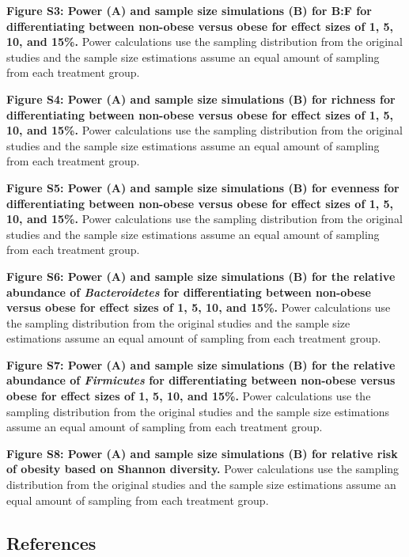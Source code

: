 \documentclass[12pt,]{article}
\begin{document}
\textbf{Figure S3: Power (A) and sample size simulations (B) for B:F for
differentiating between non-obese versus obese for effect sizes of 1, 5,
10, and 15\%.} Power calculations use the sampling distribution from the
original studies and the sample size estimations assume an equal amount
of sampling from each treatment group.

\textbf{Figure S4: Power (A) and sample size simulations (B) for
richness for differentiating between non-obese versus obese for effect
sizes of 1, 5, 10, and 15\%.} Power calculations use the sampling
distribution from the original studies and the sample size estimations
assume an equal amount of sampling from each treatment group.

\textbf{Figure S5: Power (A) and sample size simulations (B) for
evenness for differentiating between non-obese versus obese for effect
sizes of 1, 5, 10, and 15\%.} Power calculations use the sampling
distribution from the original studies and the sample size estimations
assume an equal amount of sampling from each treatment group.

\textbf{Figure S6: Power (A) and sample size simulations (B) for the
relative abundance of \emph{Bacteroidetes} for differentiating between
non-obese versus obese for effect sizes of 1, 5, 10, and 15\%.} Power
calculations use the sampling distribution from the original studies and
the sample size estimations assume an equal amount of sampling from each
treatment group.

\textbf{Figure S7: Power (A) and sample size simulations (B) for the
relative abundance of \emph{Firmicutes} for differentiating between
non-obese versus obese for effect sizes of 1, 5, 10, and 15\%.} Power
calculations use the sampling distribution from the original studies and
the sample size estimations assume an equal amount of sampling from each
treatment group.

\textbf{Figure S8: Power (A) and sample size simulations (B) for
relative risk of obesity based on Shannon diversity.} Power calculations
use the sampling distribution from the original studies and the sample
size estimations assume an equal amount of sampling from each treatment
group.

\newpage

\subsection*{References}\label{references}
\end{document}
